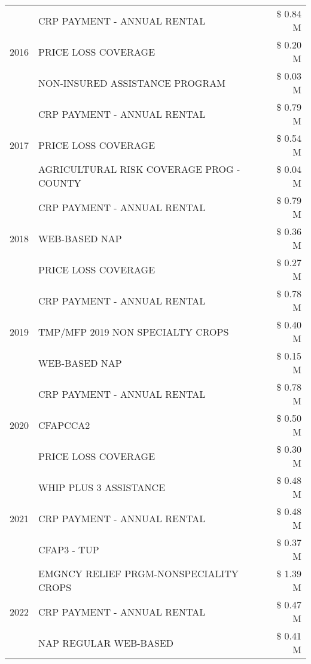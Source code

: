 \begin{tabular}{llr}
\cline{1-3}
\multirow[t]{3}{*}{2016} & CRP PAYMENT - ANNUAL RENTAL & \$ 0.84 M \\
 & PRICE LOSS COVERAGE & \$ 0.20 M \\
 & NON-INSURED ASSISTANCE PROGRAM & \$ 0.03 M \\
\cline{1-3}
\multirow[t]{3}{*}{2017} & CRP PAYMENT - ANNUAL RENTAL & \$ 0.79 M \\
 & PRICE LOSS COVERAGE & \$ 0.54 M \\
 & AGRICULTURAL RISK COVERAGE PROG - COUNTY & \$ 0.04 M \\
\cline{1-3}
\multirow[t]{3}{*}{2018} & CRP PAYMENT - ANNUAL RENTAL & \$ 0.79 M \\
 & WEB-BASED NAP & \$ 0.36 M \\
 & PRICE LOSS COVERAGE & \$ 0.27 M \\
\cline{1-3}
\multirow[t]{3}{*}{2019} & CRP PAYMENT - ANNUAL RENTAL & \$ 0.78 M \\
 & TMP/MFP 2019 NON SPECIALTY CROPS & \$ 0.40 M \\
 & WEB-BASED NAP & \$ 0.15 M \\
\cline{1-3}
\multirow[t]{3}{*}{2020} & CRP PAYMENT - ANNUAL RENTAL & \$ 0.78 M \\
 & CFAPCCA2 & \$ 0.50 M \\
 & PRICE LOSS COVERAGE & \$ 0.30 M \\
\cline{1-3}
\multirow[t]{3}{*}{2021} & WHIP PLUS 3 ASSISTANCE & \$ 0.48 M \\
 & CRP PAYMENT - ANNUAL RENTAL & \$ 0.48 M \\
 & CFAP3 - TUP & \$ 0.37 M \\
\cline{1-3}
\multirow[t]{3}{*}{2022} & EMGNCY RELIEF PRGM-NONSPECIALITY CROPS & \$ 1.39 M \\
 & CRP PAYMENT - ANNUAL RENTAL & \$ 0.47 M \\
 & NAP REGULAR WEB-BASED & \$ 0.41 M \\
\cline{1-3}
\bottomrule
\end{tabular}

